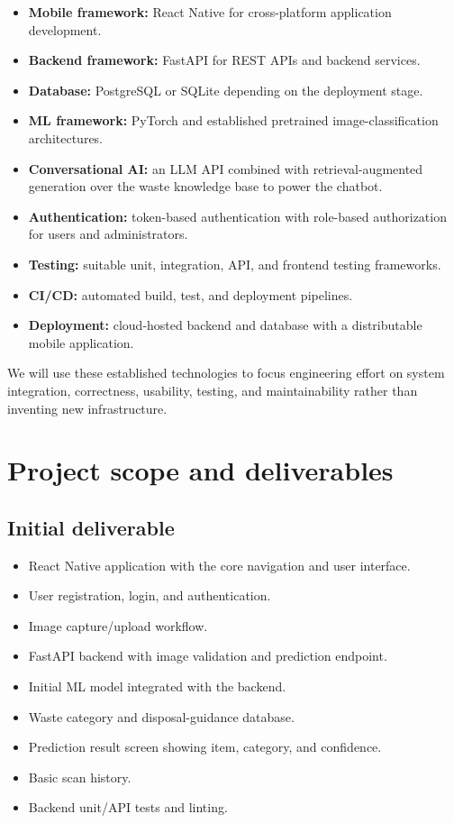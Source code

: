 \documentclass[11pt,a4paper]{article}
\begin{document}
\begin{itemize}[leftmargin=0.7cm]
    \item \textbf{Mobile framework:} React Native for cross-platform application development.
    \item \textbf{Backend framework:} FastAPI for REST APIs and backend services.
    \item \textbf{Database:} PostgreSQL or SQLite depending on the deployment stage.
    \item \textbf{ML framework:} PyTorch and established pretrained image-classification architectures.
    \item \textbf{Conversational AI:} an LLM API combined with retrieval-augmented generation over the waste knowledge base to power the chatbot.
    \item \textbf{Authentication:} token-based authentication with role-based authorization for users and administrators.
    \item \textbf{Testing:} suitable unit, integration, API, and frontend testing frameworks.
    \item \textbf{CI/CD:} automated build, test, and deployment pipelines.
    \item \textbf{Deployment:} cloud-hosted backend and database with a distributable mobile application.
\end{itemize}

We will use these established technologies to focus engineering effort on system integration, correctness, usability, testing, and maintainability rather than inventing new infrastructure.

\section{Project scope and deliverables}

\subsection{Initial deliverable}

\begin{itemize}[leftmargin=0.7cm]
    \item React Native application with the core navigation and user interface.
    \item User registration, login, and authentication.
    \item Image capture/upload workflow.
    \item FastAPI backend with image validation and prediction endpoint.
    \item Initial ML model integrated with the backend.
    \item Waste category and disposal-guidance database.
    \item Prediction result screen showing item, category, and confidence.
    \item Basic scan history.
    \item Backend unit/API tests and linting.
\end{itemize}
\end{document}

